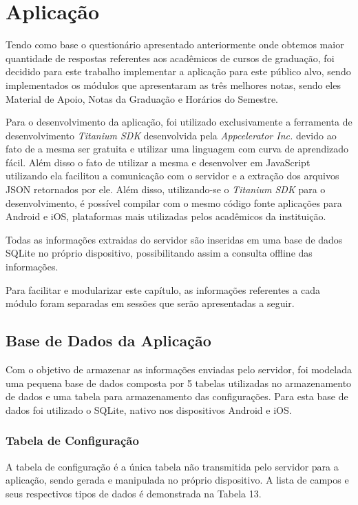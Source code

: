 \chapter{Aplicação}


Tendo como base o questionário apresentado anteriormente onde obtemos maior quantidade de respostas referentes aos acadêmicos de cursos de graduação, foi decidido para este trabalho implementar a aplicação para este público alvo, sendo implementados os módulos que apresentaram as três melhores notas, sendo eles Material de Apoio, Notas da Graduação e Horários do Semestre.

Para o desenvolvimento da aplicação, foi utilizado exclusivamente a ferramenta de desenvolvimento \emph{Titanium SDK} desenvolvida pela \emph{Appcelerator Inc.} devido ao fato de a mesma ser gratuita e utilizar uma linguagem com curva de aprendizado fácil. Além disso o fato de utilizar a mesma e desenvolver em JavaScript utilizando ela facilitou a comunicação com o servidor e a extração dos arquivos JSON retornados por ele. Além disso, utilizando-se o \emph{Titanium SDK} para o desenvolvimento, é possível compilar com o mesmo código fonte aplicações para Android e iOS, plataformas mais utilizadas pelos acadêmicos da instituição.

Todas as informações extraidas do servidor são inseridas em uma base de dados SQLite no próprio dispositivo, possibilitando assim a consulta offline das informações.

Para facilitar e modularizar este capítulo, as informações referentes a cada módulo foram separadas em sessões que serão apresentadas a seguir.

\section{Base de Dados da Aplicação}

Com o objetivo de armazenar as informações enviadas pelo servidor, foi modelada uma pequena base de dados composta por 5 tabelas utilizadas no armazenamento de dados e uma tabela para armazenamento das configurações. Para esta base de dados foi utilizado o SQLite, nativo nos dispositivos Android e iOS.

\subsection{Tabela de Configuração}
A tabela de configuração é a única tabela não transmitida pelo servidor para a aplicação, sendo gerada e manipulada no próprio dispositivo. A lista de campos e seus respectivos tipos de dados é demonstrada na Tabela 13.

